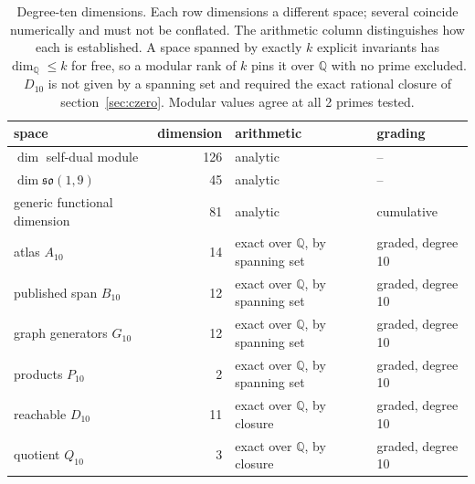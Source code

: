 \begin{table}[t]
\centering
\small
\begin{tabular}{lrll}
\toprule
space & dimension & arithmetic & grading \\
\midrule
$\dim$ self-dual module & 126 & analytic & -- \\
$\dim \mathfrak{so}(1,9)$ & 45 & analytic & -- \\
generic functional dimension & 81 & analytic & cumulative \\
atlas $A_{10}$ & 14 & exact over $\mathbb{Q}$, by spanning set & graded, degree 10 \\
published span $B_{10}$ & 12 & exact over $\mathbb{Q}$, by spanning set & graded, degree 10 \\
graph generators $G_{10}$ & 12 & exact over $\mathbb{Q}$, by spanning set & graded, degree 10 \\
products $P_{10}$ & 2 & exact over $\mathbb{Q}$, by spanning set & graded, degree 10 \\
reachable $D_{10}$ & 11 & exact over $\mathbb{Q}$, by closure & graded, degree 10 \\
quotient $Q_{10}$ & 3 & exact over $\mathbb{Q}$, by closure & graded, degree 10 \\
\bottomrule
\end{tabular}
\caption{Degree-ten dimensions. Each row dimensions a different space; several coincide numerically and must not be conflated. The arithmetic column distinguishes how each is established. A space spanned by exactly $k$ explicit invariants has $\dim_{\mathbb{Q}} \le k$ for free, so a modular rank of $k$ pins it over $\mathbb{Q}$ with no prime excluded. $D_{10}$ is not given by a spanning set and required the exact rational closure of section~\ref{sec:czero}. Modular values agree at all 2 primes tested.}
\label{tab:dims}
\end{table}
